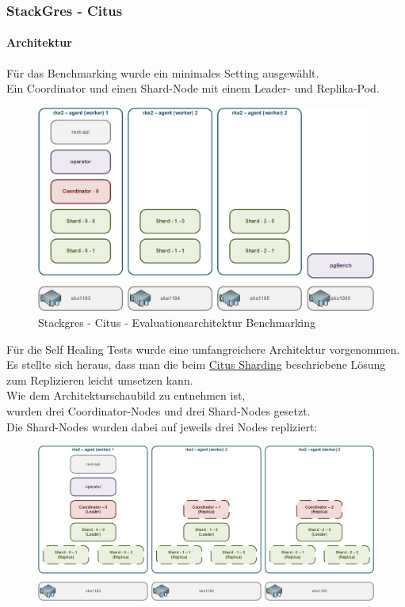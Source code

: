 
\begin{flushleft}
    \subsubsection{StackGres - Citus}
    \paragraph{Architektur}
    Für das Benchmarking wurde ein minimales Setting ausgewählt.\\
    Ein Coordinator und einen Shard-Node mit einem Leader- und Replika-Pod.\\
    \begin{figure}[H]
        \centering
        \includegraphics[width=0.8\linewidth]{source/implementation/evaluation/postgresql_ha_solutions/stackgres/stackgres-citus-evaluation-architecture}
        \caption{Stackgres - Citus - Evaluationsarchitektur Benchmarking}
        \label{fig:stackgres-citus-evaluation-architecture}
    \end{figure}
    Für die Self Healing Tests wurde eine umfangreichere Architektur vorgenommen.\\
    Es stellte sich heraus, dass man die beim \hyperref[subpar:citus_sharding]{Citus Sharding} beschriebene Lösung zum Replizieren leicht umsetzen kann.\\
    Wie dem Architekturschaubild zu entnehmen ist,\\
    wurden drei Coordinator-Nodes und drei Shard-Nodes gesetzt.\\
    Die Shard-Nodes wurden dabei auf jeweils drei Nodes repliziert:
    \begin{figure}[H]
        \centering
        \includegraphics[width=1\linewidth]{source/implementation/evaluation/postgresql_ha_solutions/stackgres/stackgres_citus_architecture_self_healing_test}

\end{figure}
\end{flushleft}
